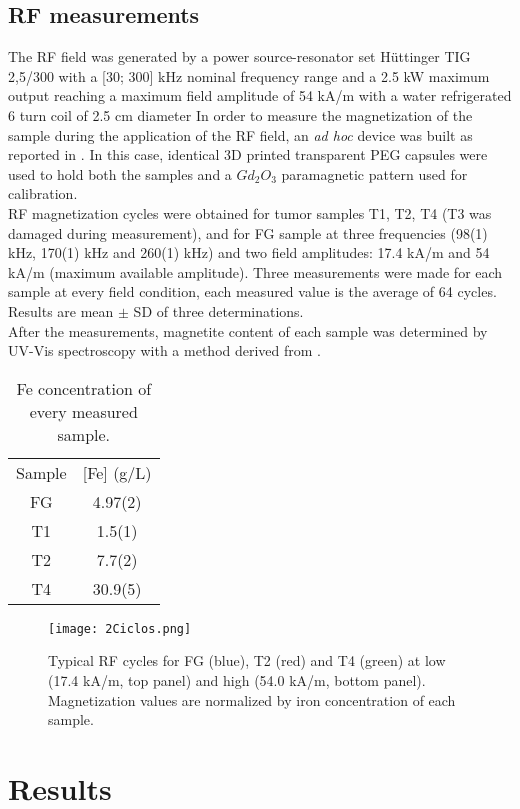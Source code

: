 \documentclass[preprint,12pt]{elsarticle}
\begin{document}
\subsection{RF measurements}
The RF field was generated by a power source-resonator set Hüttinger TIG 2,5/300 with a [30; 300] kHz nominal frequency range and a 2.5 kW maximum output reaching a maximum field amplitude of 54 kA/m with a water refrigerated 6 turn coil of 2.5 cm diameter
In order to measure the magnetization of the sample during the application of the RF field, an \textit{ad hoc} device was built as reported in \cite{bruvera2019typical}. In this case,  identical 3D printed transparent PEG capsules were used to hold both the samples and a $Gd_2O_3$ paramagnetic pattern used for calibration.\\  
RF magnetization cycles were obtained for tumor samples T1, T2, T4 (T3 was damaged during measurement), and for FG sample at three frequencies (98(1) kHz, 170(1) kHz and 260(1) kHz) and two field amplitudes: 17.4 kA/m and 54 kA/m (maximum available amplitude). Three measurements were made for each sample at every field condition, each measured value is the  average of 64 cycles. Results are mean $\pm$ SD of three determinations.\\ 
After the measurements, magnetite content of each sample was determined by UV-Vis spectroscopy with a method derived from \cite{adams1995determining}.
\begin{table}
\centering
\begin{tabular}{|c | c|}
\rowcolor{Gray}
\hline
Sample  & [Fe] (g/L) \\
\rowcolor{Blue}
\hline
FG & 4.97(2)\\
\hline
T1 & 1.5(1)\\
\hline
\rowcolor{Red}
T2 & 7.7(2)\\
\hline
\rowcolor{Green}
T4 & 30.9(5)\\
\hline
\end{tabular}
\caption{Fe concentration of every measured sample.}
\end{table}
\begin{figure}
    \centering
    \texttt{[image: 2Ciclos.png]}
    \caption{Typical RF cycles for FG (blue), T2 (red) and T4 (green) at low (17.4 kA/m, top panel) and high (54.0 kA/m, bottom panel). Magnetization values are normalized by iron concentration of each sample.}
    \label{ciclos}
\end{figure}
\section{Results}
\end{document}
